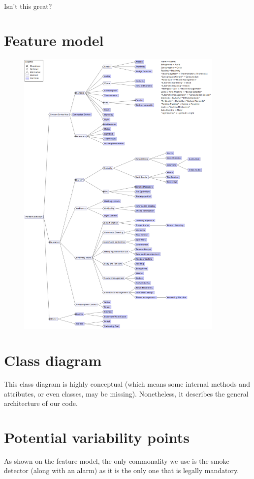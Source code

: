 			Isn't this great?
		
	\section{Feature model}		
        \begin{figure}[H]
            \includegraphics[width=0.9\textwidth]{FeatureModel_3.png}
        \end{figure}
	
	\section{Class diagram}
		This class diagram is highly conceptual (which means some internal methods and attributes, or even classes, may be missing). Nonetheless, it describes the general architecture of our code.
		
		
	\section{Potential variability points}
		As shown on the feature model, the only commonality we use is the smoke detector (along with an alarm) as it is the only one that is legally mandatory.
		
